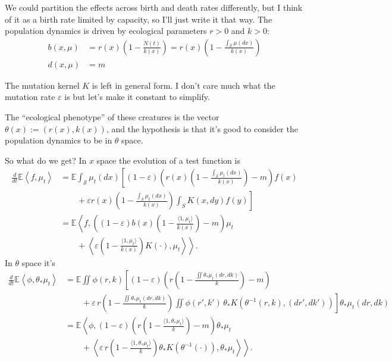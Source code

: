 \documentclass[11pt]{amsart}
\theoremstyle{remark}
\theoremstyle{definition}
\begin{document}
We could partition the effects across birth and death rates differently,
but I think of it as a birth rate limited by capacity, so I'll
just write it that way. The population dynamics is driven by
ecological parameters $r>0$ and $k>0$:
\begin{align*}
	b(x,\mu) &= r(x) \left( 1 - \frac{N(t)}{k(x)} \right) = r(x) \left( 1 - \frac{\int_{\mathcal{S}} \mu(dx)}{k(x)} \right) \\
	d(x,\mu) &= m
\end{align*}

The mutation kernel $K$ is left in general form.
I don't care much what the mutation rate $\varepsilon$ is but let's make it
constant to simplify.

The ``ecological phenotype'' of these creatures is the vector
$\theta(x) := (r(x),k(x))$, and the hypothesis is that it's good to
consider the population dynamics to be in $\theta$ space.

So what do we get? In $x$ space the evolution of a test function is
\begin{align*}
	\frac{d}{dt} \mathbb{E}\left\langle f, \mu_t \right\rangle 
	&= \mathbb{E} \int_{\mathcal{S}} \mu_t(dx) \left[ (1-\varepsilon) \left( r(x) \left( 1 - \frac{\int_{\mathcal{S}} \mu_t(dx)}{k(x)} \right) - m \right) f(x) \right. \\
	& \left. \qquad\mbox{} + \varepsilon r(x) \left( 1 - \frac{\int_{\mathcal{S}} \mu_t(dx)}{k(x)} \right) \int_{S} K(x,dy) f(y) \right] \\
	&= \mathbb{E}\left\langle f, \left( (1-\varepsilon) b(x) \left(1 - \frac{\langle 1,\mu_t\rangle}{k(x)} \right) - m \right) \mu_t \right. \\
	& \left. \qquad\mbox{} + \left\langle \varepsilon \left( 1 - \frac{\langle 1,\mu_t\rangle}{k(x)} \right) K(\cdot), \mu_t \right\rangle \right\rangle .
\end{align*}
%
In $\theta$ space it's
\begin{align*}
	\frac{d}{dt} \mathbb{E}\left\langle \phi, \theta_{*}\mu_t \right\rangle
	&= \mathbb{E} \iint \phi(r,k) \left[ (1-\varepsilon)
		\left( r \left( 1 - \frac{\iint \theta_{*}\mu_t(dr,dk)}{k} \right) - m \right) \right. \\
	& \left. \qquad\mbox{} + \varepsilon\, r \left( 1 - \frac{\iint \theta_{*}\mu_t(dr,dk)}{k} \right) \iint \phi(r',k')\, \theta_{*}K(\theta^{-1}(r,k),(dr',dk')) \right] \theta_{*}\mu_t(dr,dk) \\
	&= \mathbb{E}\left\langle \phi, 
		(1-\varepsilon) \left( r \left( 1 - \frac{\langle 1,\theta_{*}\mu_t\rangle}{k} \right) - m \right) \theta_*{\mu_t} \right. \\
	& \left. \qquad\mbox{} + \left\langle \varepsilon\, r \left( 1 - \frac{\langle 1,\theta_{*}\mu_t\rangle}{k} \right) \theta_{*}K(\theta^{-1}(\cdot)), \theta_{*}\mu_t \right\rangle \right\rangle .
\end{align*}
\end{document}
